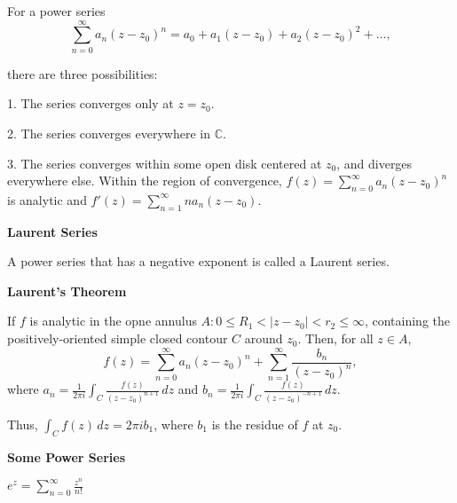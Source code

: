 \documentclass{article}
\begin{document}
    For a power series $$\sum_{n=0}^\infty a_n(z-z_0)^n = a_0 + a_1(z-z_0) + a_2(z-z_0)^2 + \hdots,$$

    there are three possibilities:

    1. The series converges only at $z=z_0$.

    2. The series converges everywhere in $\mathbb C$.

    3. The series converges within some open disk centered at $z_0$, and diverges everywhere else.
    Within the region of convergence, $f(z) = \sum_{n=0}^\infty a_n(z-z_0)^n$ is analytic and $f'(z) = \sum_{n=1}^\infty na_n(z-z_0)$.

\medskip\noindent\textbf{Laurent Series}

    A power series that has a negative exponent is called a Laurent series.

\medskip\noindent\textbf{Laurent's Theorem}

    If $f$ is analytic in the opne annulus $A: 0 \leq R_1 < |z-z_0| < r_2 \leq \infty$, containing the positively-oriented simple closed contour $C$ around $z_0$.
     Then, for all $z \in A$, $$f(z) = \sum_{n=0}^\infty a_n(z-z_0)^n + \sum_{n=1}^\infty \frac{b_n}{(z-z_0)^n},$$
    where $a_n = \frac1{2\pi i} \int_{C} \frac{f(z)}{(z-z_0)^{n+1}}\,dz$ and $b_n=\frac{1}{2\pi i} \int_C\frac{f(z)}{(z-z_0)^{-n+1}}\,dz$.

    Thus, $\int_C f(z) \,dz = 2\pi i b_1$, where $b_1$ is the residue of $f$ at $z_0$.

\medskip\noindent\textbf{Some Power Series}

    $e^z = \sum_{n=0}^\infty \frac{z^n}{n!}$

     
\end{document}
